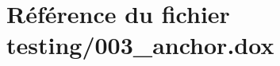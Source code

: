 \hypertarget{003__anchor_8dox}{}\section{Référence du fichier testing/003\+\_\+anchor.dox}
\label{003__anchor_8dox}
